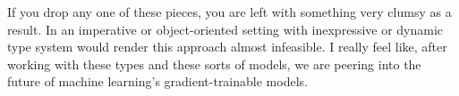 \documentclass[]{article}
\begin{document}
If you drop any one of these pieces, you are left with something very clumsy as
a result. In an imperative or object-oriented setting with inexpressive or
dynamic type system would render this approach almost infeasible. I really feel
like, after working with these types and these sorts of models, we are peering
into the future of machine learning's gradient-trainable models.
\end{document}
